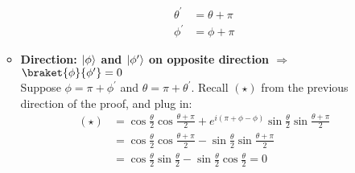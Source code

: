 \documentclass[a4paper,10pt]{hw}
\DeclarePairedDelimiter\ket{\lvert}{\rangle}
\begin{document}
\begin{enumerate}
\begin{itemize}
	\begin{align*}
	\theta^\prime & =  \theta + \pi \\
	\phi^\prime & =  \phi + \pi
	\end{align*}
	
	\item \textbf{Direction: $\ket{\phi}$ and $\ket{\phi^\prime}$ on opposite direction $\Rightarrow$ $\braket{\phi}{\phi^\prime} = 0$} \\
	Suppose $\phi = \pi + \phi^\prime$ and $\theta = \pi + \theta^\prime$. Recall $(\star)$ from the previous direction of the proof, and plug in:
	\begin{align*}
	(\star) & = \cos{\frac{\theta}{2}} \cos{\frac{\theta + \pi}{2}} + e^{i(\pi + \phi - \phi)}\sin{\frac{\theta}{2}} \sin{\frac{\theta + \pi}{2}} \\
	& = \cos{\frac{\theta}{2}} \cos{\frac{\theta + \pi}{2}} - \sin{\frac{\theta}{2}} \sin{\frac{\theta + \pi}{2}} \\
	& = \cos{\frac{\theta}{2}} \sin{\frac{\theta}{2}} - \sin{\frac{\theta}{2}} \cos{\frac{\theta}{2}} = 0
	\end{align*}
\end{itemize}

\end{enumerate}
\end{document}

